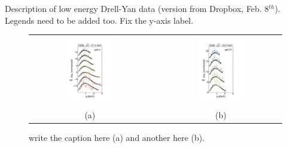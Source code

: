 \documentclass[aps,preprintnumbers,showpacs,nofootinbib,superscriptaddress,floatfix]{revtex4}
\begin{document}
Description of low energy Drell-Yan data (version from Dropbox, Feb. 8$^{th}$).
Legends need to be added too. Fix the y-axis label.
\begin{figure}[h!]
\centering
\begin{tabular}{ccc}
\includegraphics[width=0.40\textwidth]{plots/DY-Z/DY_SCIplot_flINDEP_1.pdf}
&\hspace{0.001cm}
&
\includegraphics[width=0.40\textwidth]{plots/DY-Z/DY_SCIplot_flINDEP_2.pdf}
\\
(a) && (b)
\end{tabular}
\caption{write the caption here (a) and another here (b).}
\label{f:DY_panel_1}
\end{figure}
\end{document}
